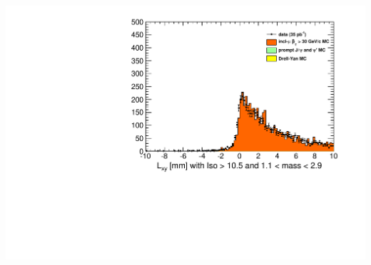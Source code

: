 \documentclass[compress]{beamer}
\begin{document}
\begin{frame}
\begin{columns}
\includegraphics[width=\linewidth]{lowdimuon_lxy_midmass_noniso.pdf}
\end{columns}
\end{frame}
\end{document}
